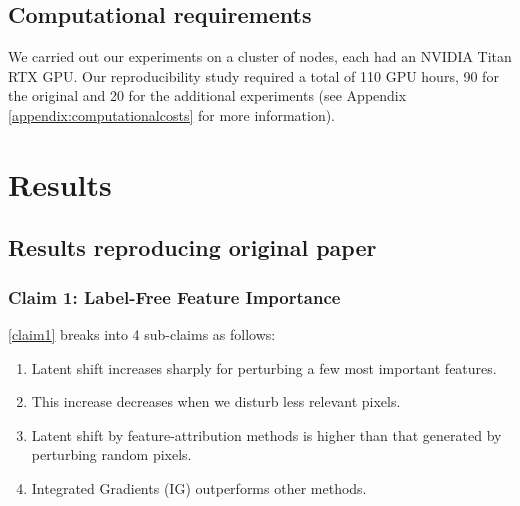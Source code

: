 
\subsection{Computational requirements}
We carried out our experiments on a cluster of nodes, each had an NVIDIA Titan RTX GPU. Our reproducibility study required a total of 110 GPU hours, 90 for the original and 20 for the additional experiments (see Appendix \ref{appendix:computationalcosts} for more information).

\section{Results}
\label{section:results}


\subsection{Results reproducing original paper}

\subsubsection{Claim 1: Label-Free Feature Importance}
\label{sssec:result1}
\ref{claim1} breaks into 4 sub-claims as follows:
\begin{enumerate}[labelindent=\parindent,leftmargin=*, topsep=0pt]
    \itemsep-0.2em
    \item\label{th:first} Latent shift increases sharply for perturbing a few most important features.
    \item \label{th:second}This increase decreases when we disturb less relevant pixels.
    \item \label{th:third}Latent shift by feature-attribution methods is higher than that generated by perturbing random pixels.
    \item \label{th:fourth} Integrated Gradients (IG) outperforms other methods.
\end{enumerate}

